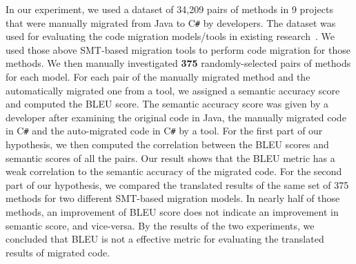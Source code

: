%

In our experiment, we used a dataset of 34,209 pairs of methods
in 9 projects that were manually migrated from Java to
C\texttt{\#} by developers. The dataset was used for evaluating the
code migration models/tools in existing research~\cite{ase15}. We used
those above SMT-based migration tools to perform code migration for
those methods. We then manually investigated {\bf 375}
randomly-selected pairs of methods for each model. For each pair of the manually
migrated method and the automatically migrated one from a tool, we
assigned a semantic accuracy score and computed the BLEU score. The
semantic accuracy score was given by a developer after examining the
original code in Java, the manually migrated code in C\texttt{\#} and
the auto-migrated code in C\texttt{\#} by a tool. For the first part
of our hypothesis, we then computed the correlation between the BLEU
scores and semantic scores of all the pairs. Our result shows that the
BLEU metric has a weak correlation to the semantic accuracy of the
migrated code. For the second part of our hypothesis, we compared the
translated results of the same set of 375 methods for two different
SMT-based migration models. In nearly half of those methods, an
improvement of BLEU score does not indicate an improvement in semantic
score, and vice-versa.
By the results of the two experiments, we concluded that BLEU is not a 
effective metric for evaluating the translated results of migrated code. 


